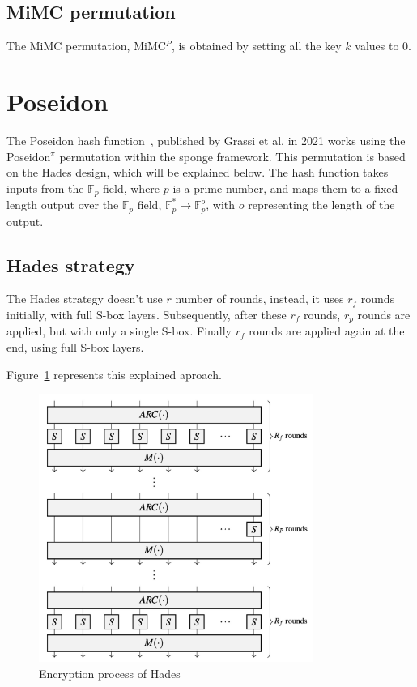 \subsection*{MiMC permutation}
The MiMC permutation, MiMC$^P$, is obtained by setting all the key $k$ values to 0.

\section{Poseidon}
\label{sec:poseidon}
The Poseidon hash function~\cite{grassi2021poseidon}, published by Grassi et al. in 2021 works using the Poseidon$^\pi$ permutation within the sponge framework. This permutation is based on the Hades design, which will be explained below.
The hash function takes inputs from the $\mathbb{F}_{p}$ field, where $p$ is a prime number, and maps them to a fixed-length output over the $\mathbb{F}_{p}$ field, $\mathbb{F}_{p}^*\longrightarrow\mathbb{F}_{p}^o$, with $o$ representing the length of the output.

\subsection*{Hades strategy}
The Hades strategy doesn't use $r$ number of rounds, instead, it uses $r_f$ rounds initially, with full S-box layers. Subsequently, after these $r_f$ rounds, $r_p$ rounds are applied, but with only a single S-box. Finally $r_f$ rounds are applied again at the end, using full S-box layers.

Figure~\ref{fig:hades-enc-img} represents this explained aproach.\\
\begin{figure}[htbp]
    \centering
    \includegraphics[width=0.8\textwidth]{graphics/hades_enc.jpg}
    \caption{Encryption process of Hades~\cite{grassi2021poseidon}}
    \label{fig:hades-enc-img}
\end{figure}

